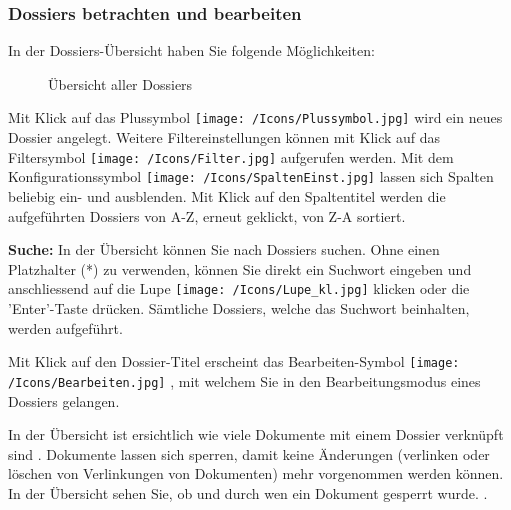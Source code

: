 \pagebreak
\subsubsection{Dossiers betrachten und bearbeiten}

In der Dossiers-Übersicht haben Sie folgende Möglichkeiten:

\begin{figure}[H]
\caption{Übersicht aller Dossiers}
\end{figure}

Mit Klick auf das Plussymbol \texttt{[image: /Icons/Plussymbol.jpg]}  wird ein neues Dossier angelegt. Weitere Filtereinstellungen können mit Klick auf das Filtersymbol \texttt{[image: /Icons/Filter.jpg]}  aufgerufen werden. Mit dem Konfigurationssymbol \texttt{[image: /Icons/SpaltenEinst.jpg]}  lassen sich Spalten beliebig ein- und ausblenden. Mit Klick auf den Spaltentitel  werden die aufgeführten Dossiers von A-Z, erneut geklickt, von Z-A sortiert.

\vspace{\baselineskip}

\textbf{Suche:} In der Übersicht können Sie nach Dossiers suchen. Ohne einen Platzhalter (*) zu verwenden, können Sie direkt ein Suchwort eingeben und anschliessend auf die Lupe \texttt{[image: /Icons/Lupe\_kl.jpg]}  klicken oder die 'Enter'-Taste drücken. Sämtliche Dossiers, welche das Suchwort beinhalten, werden aufgeführt. \newline

Mit Klick auf den Dossier-Titel  erscheint das Bearbeiten-Symbol \texttt{[image: /Icons/Bearbeiten.jpg]} , mit welchem Sie in den Bearbeitungsmodus eines Dossiers gelangen.

In der Übersicht ist ersichtlich wie viele Dokumente mit einem Dossier verknüpft sind .
Dokumente lassen sich sperren, damit keine Änderungen (verlinken oder löschen von Verlinkungen von Dokumenten) mehr vorgenommen werden können. In der Übersicht sehen Sie, ob und durch wen ein Dokument gesperrt wurde. .

